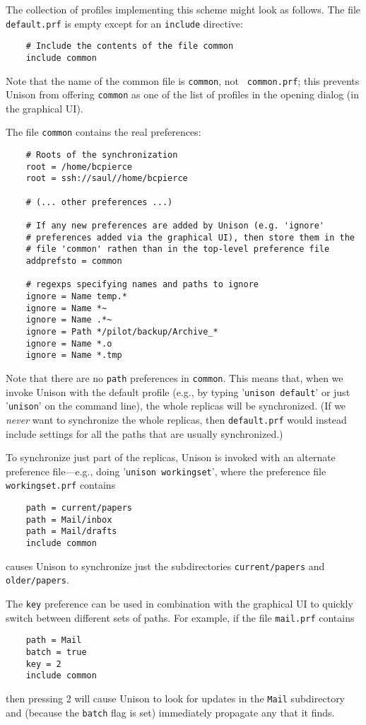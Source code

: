 \documentclass{article}
\begin{document}
The collection
of profiles implementing this scheme might look as follows.
%
The file {\tt default.prf} is empty except for an {\tt include}
directive:
\begin{verbatim}
    # Include the contents of the file common
    include common
\end{verbatim}
Note that the name of the common file is {\tt common}, not {\tt
  common.prf}; this prevents Unison from offering {\tt common} as one of
the list of profiles in the opening dialog (in the graphical UI).

The file {\tt common} contains the real preferences:
\begin{verbatim}
    # Roots of the synchronization
    root = /home/bcpierce
    root = ssh://saul//home/bcpierce

    # (... other preferences ...)

    # If any new preferences are added by Unison (e.g. 'ignore'
    # preferences added via the graphical UI), then store them in the
    # file 'common' rathen than in the top-level preference file
    addprefsto = common

    # regexps specifying names and paths to ignore
    ignore = Name temp.*
    ignore = Name *~
    ignore = Name .*~
    ignore = Path */pilot/backup/Archive_*
    ignore = Name *.o
    ignore = Name *.tmp
\end{verbatim}
Note that there are no {\tt path} preferences in {\tt common}.  This
means that, when we invoke Unison with the default profile (e.g., by
typing '{\tt unison default}' or just '{\tt unison}' on the command
line), the whole replicas will be synchronized.  (If we {\em never} want
to synchronize the whole replicas, then {\tt default.prf} would instead
include settings for all the paths that are usually synchronized.)

To synchronize just part of the replicas, Unison is invoked with an
alternate preference file---e.g., doing '{\tt unison workingset}', where the
preference file {\tt workingset.prf} contains
\begin{verbatim}
    path = current/papers
    path = Mail/inbox
    path = Mail/drafts
    include common
\end{verbatim}
causes Unison to synchronize just the subdirectories {\tt current/papers}
and {\tt older/papers}.

The {\tt key} preference can be used in combination with the graphical UI
to quickly switch between different sets of paths.  For example, if the
file {\tt mail.prf} contains
\begin{verbatim}
    path = Mail
    batch = true
    key = 2
    include common
\end{verbatim}
then pressing 2 will cause Unison to look for updates in the {\tt Mail}
subdirectory and (because the {\tt batch} flag is set) immediately
propagate any that it finds.
\end{document}
